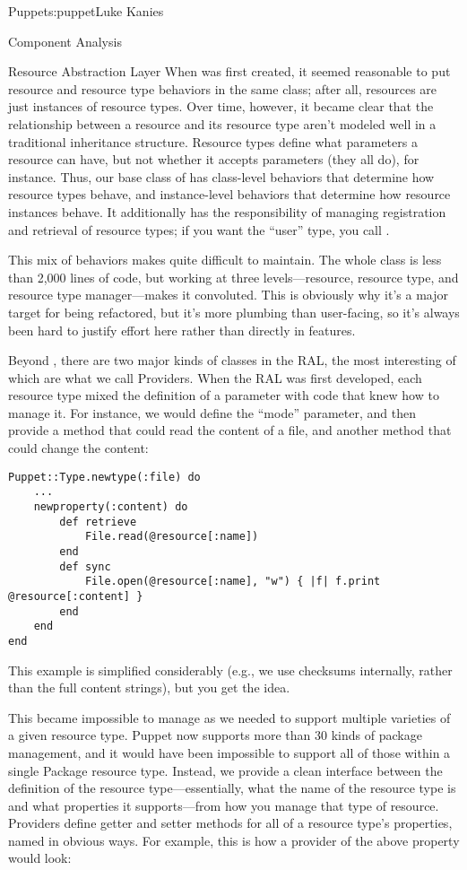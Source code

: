 \begin{aosachapter}{Puppet}{s:puppet}{Luke Kanies}
\begin{aosasect1}{Component Analysis}
\begin{aosasect2}{Resource Abstraction Layer}
When  was first created, it seemed reasonable to put
resource and resource type behaviors in the same class; after all,
resources are just instances of resource types.  Over time, however,
it became clear that the relationship between a resource and its
resource type aren't modeled well in a traditional inheritance
structure.  Resource types define what parameters a resource can have,
but not whether it accepts parameters (they all do), for instance.
Thus, our base class of  has class-level behaviors that
determine how resource types behave, and instance-level behaviors that
determine how resource instances behave.  It additionally has the
responsibility of managing registration and retrieval of resource
types; if you want the ``user'' type, you call
.

This mix of behaviors makes  quite difficult to maintain.
The whole class is less than 2,000 lines of code, but working at three
levels---resource, resource type, and resource type manager---makes
it convoluted.  This is obviously why it's a major target for being
refactored, but it's more plumbing than user-facing, so it's always
been hard to justify effort here rather than directly in features.

Beyond , there are two major kinds of classes in the RAL,
the most interesting of which are what we call Providers.  When the
RAL was first developed, each resource type mixed the definition of a
parameter with code that knew how to manage it.  For instance, we
would define the ``mode'' parameter, and then provide a method that
could read the content of a file, and another method that could change
the content:

\begin{verbatim}
Puppet::Type.newtype(:file) do
    ...
    newproperty(:content) do
        def retrieve
            File.read(@resource[:name])
        end
        def sync
            File.open(@resource[:name], "w") { |f| f.print @resource[:content] }
        end
    end
end
\end{verbatim}

\noindent This example is simplified considerably (e.g., we use checksums
internally, rather than the full content strings), but you get the
idea.

This became impossible to manage as we needed to support multiple
varieties of a given resource type.  Puppet now supports more than 30
kinds of package management, and it would have been impossible to
support all of those within a single Package resource type.  Instead,
we provide a clean interface between the definition of the resource
type---essentially, what the name of the resource type is and what
properties it supports---from how you manage that type of resource.
Providers define getter and setter methods for all of a resource
type's properties, named in obvious ways.  For example, this is how a
provider of the above property would look:


\end{aosasect2}
\end{aosasect1}
\end{aosachapter}
